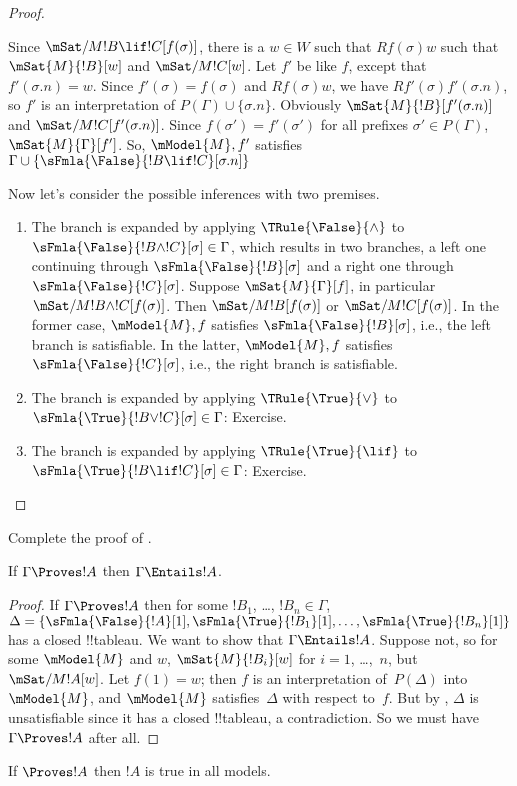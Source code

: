 \documentclass[../../../include/open-logic-section]{subfiles}
\begin{document}
\begin{proof}
\begin{enumerate}
  Since $\mSat/{M}{!B \lif !C}[f(\sigma)]$, there is a $w \in W$ such
  that $Rf(\sigma)w$ such that $\mSat{M}{!B}[w]$ and
  $\mSat/{M}{!C}[w]$. Let $f'$ be like $f$, except that $f'(\sigma.n)
  = w$. Since $f'(\sigma) = f(\sigma)$ and $Rf(\sigma)w$, we have
  $Rf'(\sigma)f'(\sigma.n)$, so $f'$ is an interpretation of
  $P(\Gamma) \cup \{\sigma.n\}$. Obviously
  $\mSat{M}{!B}[f'(\sigma.n)]$ and $\mSat/{M}{!C}[f'(\sigma.n)]$.
  Since $f(\sigma') = f'(\sigma')$ for all prefixes $\sigma' \in
  P(\Gamma)$, $\mSat{M}{\Gamma}[f']$.  So, $\mModel{M}, f'$ satisfies
  $\Gamma \cup \{\sFmla{\False}{!B \lif !C}[\sigma.n]\}$
\end{enumerate}
Now let's consider the possible inferences with two premises.
\begin{enumerate}
\item The branch is expanded by applying $\TRule{\False}{\land}$ to
  $\sFmla{\False}{!B \land !C}[\sigma] \in \Gamma$, which results in
  two branches, a left one continuing through
  $\sFmla{\False}{!B}[\sigma]$ and a right one through
  $\sFmla{\False}{!C}[\sigma]$. Suppose $\mSat{M}{\Gamma}[f]$, in
  particular $\mSat/{M}{!B \land !C}[f(\sigma)]$.  Then
  $\mSat/{M}{!B}[f(\sigma)]$ or $\mSat/{M}{!C}[f(\sigma)]$. In the
  former case, $\mModel{M}, f$ satisfies $\sFmla{\False}{!B}[\sigma]$,
  i.e., the left branch is satisfiable. In the latter, $\mModel{M}, f$
  satisfies $\sFmla{\False}{!C}[\sigma]$, i.e., the right branch is
  satisfiable.
\item The branch is expanded by applying $\TRule{\True}{\lor}$ to
    $\sFmla{\True}{!B \lor !C}[\sigma] \in \Gamma$: Exercise.
\item The branch is expanded by applying $\TRule{\True}{\lif}$ to
    $\sFmla{\True}{!B \lif !C}[\sigma] \in \Gamma$: Exercise.
\end{enumerate}
\end{proof}

\begin{prob}
Complete the proof of .
\end{prob}

\begin{cor}
If $\Gamma \Proves !A$ then $\Gamma \Entails !A$.
\end{cor}

\begin{proof}
  If $\Gamma \Proves !A$ then for some $!B_1$, \dots, $!B_n \in
  \Gamma$, $\Delta = \{\sFmla{\False}{!A}[1], \sFmla{\True}{!B_1}[1],
  \dots, \sFmla{\True}{!B_n}[1]\}$ has a closed !!{tableau}. We want
  to show that $\Gamma \Entails !A$. Suppose not, so for some
  $\mModel{M}$ and $w$, $\mSat{M}{!B_i}[w]$ for $i=1$, \dots,~$n$, but
  $\mSat/{M}{!A}[w]$. Let $f(1) = w$; then $f$ is an interpretation
  of~$P(\Delta)$ into~$\mModel{M}$, and $\mModel{M}$ satisfies~$\Delta$ with
  respect to~$f$. But by , $\Delta$ is
  unsatisfiable since it has a closed !!{tableau}, a
  contradiction. So we must have $\Gamma \Proves !A$ after all.
\end{proof}

\begin{cor}
If $\Proves !A$ then $!A$ is true in all models.
\end{cor}
\end{document}
